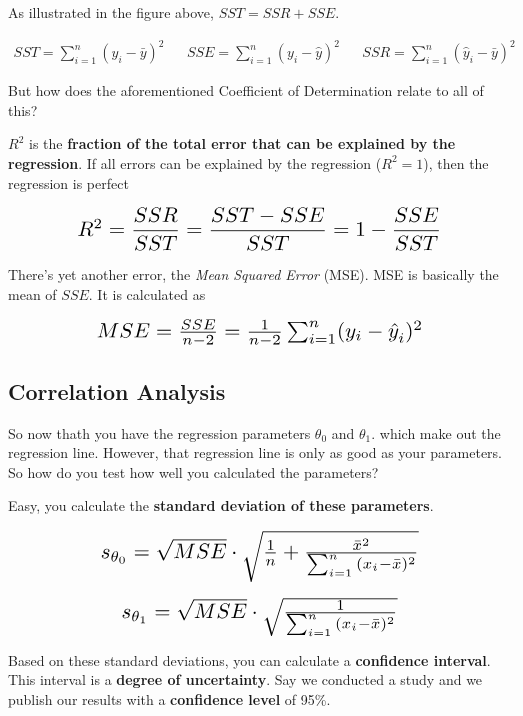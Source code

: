 \documentclass[a4paper, 11pt]{article}
\begin{document}
\vspace{10px}

As illustrated in the figure above, $SST = SSR + SSE$.

\begin{align*}
    SST = \sum^{n}_{i=1}(y_{i}-\bar y)^2 && SSE=\sum^{n}_{i=1}(y_{i}-\hat y)^2 && SSR=\sum^{n}_{i=1}(\hat y_{i}-\bar y)^2
\end{align*}


But how does the aforementioned Coefficient of Determination relate to all of this? 

$R^2$ is the \textbf{fraction of the total error that can be explained by the regression}. If all errors can be explained by the regression ($R^2 = 1$), then the regression is perfect

\[\scalebox{1.5}{
        $ R^2 = \dfrac{SSR}{SST} = \dfrac{SST-SSE}{SST} = 1 - \dfrac{SSE}{SST}$
}\]

\vspace{10px}

There's yet another error, the \textit{Mean Squared Error} (MSE). MSE is basically the mean of $SSE$. It is calculated as

\[\scalebox{1.5}{

        $MSE = \frac{SSE}{n-2} = \frac{1}{n-2}\sum_{i=1}^{n}(y_{i}-\hat{y}^{}_{i})^2$
}\]

\newpage

\subsection{Correlation Analysis}

So now thath you have the regression parameters $\theta^{}_{0}$ and $\theta^{}_{1}$. which make out the regression line. However, that regression line is only as good as your parameters. So how do you test how well you calculated the parameters?

Easy, you calculate the \textbf{standard deviation of these parameters}.

\[\scalebox{1.5}{
        $s_{\theta_{0}} = \sqrt{MSE} \cdot \sqrt{\frac{1}{n} + \frac{\bar{x}^2}{\sum_{i=1}^{n}{(x_i-\bar{x})^2}}}$
}\]

\[\scalebox{1.5}{
        $s_{\theta_{1}} = \sqrt{MSE}\cdot \sqrt{\frac{1}{\sum_{i=1}^{n}{(x_i-\bar{x})^2}}}$
}\]

\vspace{10px}

Based on these standard deviations, you can calculate a \textbf{confidence interval}. This interval is a \textbf{degree of uncertainty}. Say we conducted a study and we publish our results with a \textbf{confidence level} of 95\%.
\end{document}
